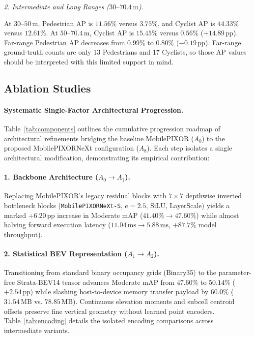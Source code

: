 \textit{2. Intermediate and Long Ranges ($30\text{--}70.4\,\text{m}$).}

At $30\text{--}50\,\text{m}$, Pedestrian AP is $11.56\%$ versus $3.75\%$, and Cyclist AP is $44.33\%$ versus $12.61\%$. At $50\text{--}70.4\,\text{m}$, Cyclist AP is $15.45\%$ versus $0.56\%$ ($+14.89\,\text{pp}$). Far-range Pedestrian AP decreases from $0.99\%$ to $0.80\%$ ($-0.19\,\text{pp}$). Far-range ground-truth counts are only 13 Pedestrians and 17 Cyclists, so those AP values should be interpreted with this limited support in mind.



\subsection{Ablation Studies}
\label{sec:ablations}

\paragraph{Systematic Single-Factor Architectural Progression.}
Table~\ref{tab:components} outlines the cumulative progression roadmap of architectural refinements bridging the baseline MobilePIXOR ($A_0$) to the proposed MobilePIXORNeXt configuration ($A_8$). Each step isolates a single architectural modification, demonstrating its empirical contribution:

\paragraph{1. Backbone Architecture ($A_0 \to A_1$).}
Replacing MobilePIXOR's legacy residual blocks with $7\times 7$ depthwise inverted bottleneck blocks (\texttt{MobilePIXORNeXt-S}, $e=2.5$, SiLU, LayerScale) yields a marked $+6.20\,\text{pp}$ increase in Moderate mAP ($41.40\% \to 47.60\%$) while almost halving forward execution latency ($11.04\,\text{ms} \to 5.88\,\text{ms}$, $+87.7\%$ model throughput).

\paragraph{2. Statistical BEV Representation ($A_1 \to A_2$).}

Transitioning from standard binary occupancy grids (Binary35) to the parameter-free Strata-BEV14 tensor advances Moderate mAP from $47.60\%$ to $50.14\%$ ($+2.54\,\text{pp}$) while slashing host-to-device memory transfer payload by $60.0\%$ ($31.54\,\text{MB}$ vs. $78.85\,\text{MB}$). Continuous elevation moments and subcell centroid offsets preserve fine vertical geometry without learned point encoders. Table~\ref{tab:encoding} details the isolated encoding comparisons across intermediate variants.

